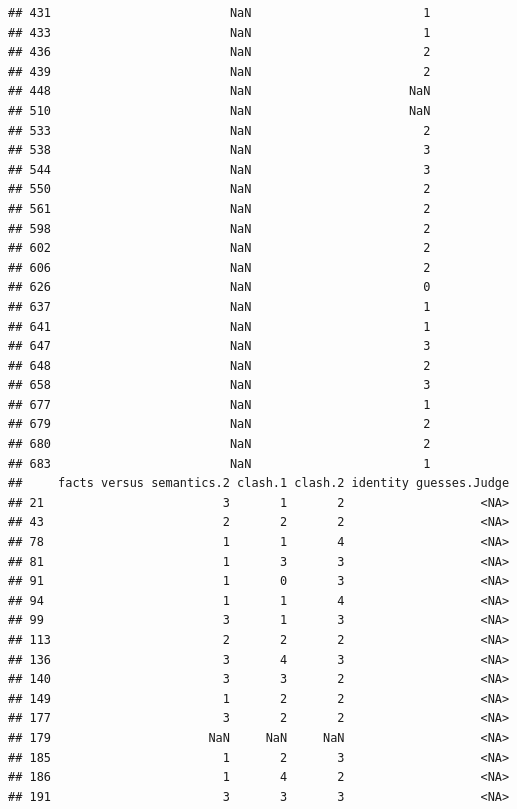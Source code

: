 \documentclass[
]{article}
\begin{document}
\begin{verbatim}
## 431                         NaN                        1
## 433                         NaN                        1
## 436                         NaN                        2
## 439                         NaN                        2
## 448                         NaN                      NaN
## 510                         NaN                      NaN
## 533                         NaN                        2
## 538                         NaN                        3
## 544                         NaN                        3
## 550                         NaN                        2
## 561                         NaN                        2
## 598                         NaN                        2
## 602                         NaN                        2
## 606                         NaN                        2
## 626                         NaN                        0
## 637                         NaN                        1
## 641                         NaN                        1
## 647                         NaN                        3
## 648                         NaN                        2
## 658                         NaN                        3
## 677                         NaN                        1
## 679                         NaN                        2
## 680                         NaN                        2
## 683                         NaN                        1
##     facts versus semantics.2 clash.1 clash.2 identity guesses.Judge
## 21                         3       1       2                   <NA>
## 43                         2       2       2                   <NA>
## 78                         1       1       4                   <NA>
## 81                         1       3       3                   <NA>
## 91                         1       0       3                   <NA>
## 94                         1       1       4                   <NA>
## 99                         3       1       3                   <NA>
## 113                        2       2       2                   <NA>
## 136                        3       4       3                   <NA>
## 140                        3       3       2                   <NA>
## 149                        1       2       2                   <NA>
## 177                        3       2       2                   <NA>
## 179                      NaN     NaN     NaN                   <NA>
## 185                        1       2       3                   <NA>
## 186                        1       4       2                   <NA>
## 191                        3       3       3                   <NA>

\end{verbatim}
\end{document}
